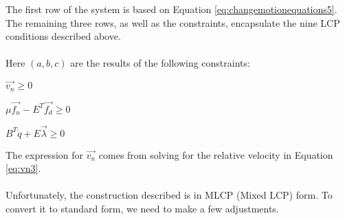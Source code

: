 The first row of the system is based on Equation \ref{eq:changemotionequations5}. The remaining three rows, as well as the constraints, encapsulate the nine LCP conditions described above.
\\
\\
Here $(a, b, c)$ are the results of the following constraints: 
\begin{packed_item}
\item $\vec{v_n} \geq 0$
\item $\mu\vec{f_n} - E^T\vec{f_d} \geq 0$
\item $B^T\dot{q} + E\vec{\lambda} \geq 0$
\end{packed_item}
The expression for $\vec{v_n}$ comes from solving for the relative velocity in Equation \ref{eq:vn3}.
\\
\\
Unfortunately, the construction described is in MLCP (Mixed LCP) form. To convert it to standard form, we need to make a few adjustments.